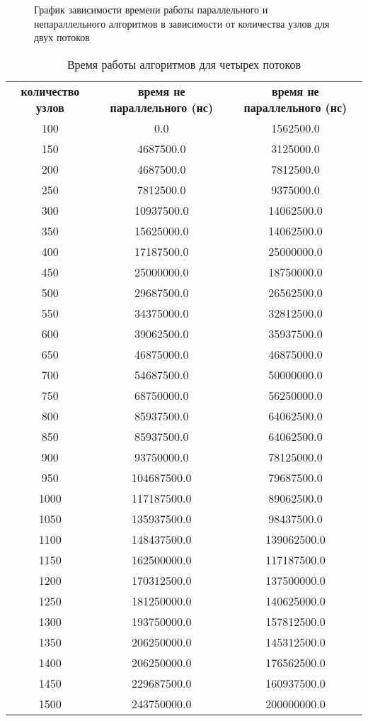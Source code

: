 \begin{figure}[H]
	\caption{График зависимости времени работы параллельного и непараллельного алгоритмов в зависимости от количества узлов для двух потоков}
	\label{fig:res_thr_2}
\end{figure}

\begin{table}[H]
  \begin{center}
    \captionsetup{justification=raggedright}
     \caption{Время работы алгоритмов для четырех потоков}
    \label{tab:thr_4}
    \begin{tabular}{c|c|c}
      \textbf{количество узлов} & \textbf{время не параллельного (нс)}  & \textbf{время не параллельного (нс)}\\
	100 & 0.0 & 1562500.0\\
	150 & 4687500.0 & 3125000.0\\
	200 & 4687500.0 & 7812500.0\\
	250 & 7812500.0 & 9375000.0\\
	300 & 10937500.0 & 14062500.0\\
	350 & 15625000.0 & 14062500.0\\
	400 & 17187500.0 & 25000000.0\\
	450 & 25000000.0 & 18750000.0\\
	500 & 29687500.0 & 26562500.0\\
	550 & 34375000.0 & 32812500.0\\
	600 & 39062500.0 & 35937500.0\\
	650 & 46875000.0 & 46875000.0\\
	700 & 54687500.0 & 50000000.0\\
	750 & 68750000.0 & 56250000.0\\
	800 & 85937500.0 & 64062500.0\\
	850 & 85937500.0 & 64062500.0\\
	900 & 93750000.0 & 78125000.0\\
	950 & 104687500.0 & 79687500.0\\
	1000 & 117187500.0 & 89062500.0\\
	1050 & 135937500.0 & 98437500.0\\
	1100 & 148437500.0 & 139062500.0\\
	1150 & 162500000.0 & 117187500.0\\
	1200 & 170312500.0 & 137500000.0\\
	1250 & 181250000.0 & 140625000.0\\
	1300 & 193750000.0 & 157812500.0\\
	1350 & 206250000.0 & 145312500.0\\
	1400 & 206250000.0 & 176562500.0\\
	1450 & 229687500.0 & 160937500.0\\
	1500 & 243750000.0 & 200000000.0\\
      \hline	
    \end{tabular}
  \end{center}
\end{table}


